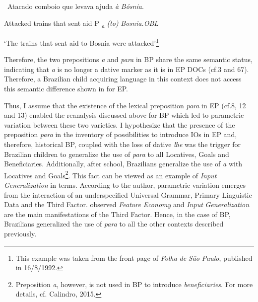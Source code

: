 \documentclass[output=paper,modfonts,nonflat]{langsci/langscibook}
\begin{document}
\ea%
    \label{ex:key:13}
    \gll\\
        \\
    \glt
    \z

         ~Atacado   comboio que levava   ajuda  \textit{à} \textit{Bósnia}. 

          Attacked  trains       that sent      aid      P \textit{\textsubscript{a} \textit{(to)} }\textit{Bosnia.OBL}

         ‘The trains that sent aid  to Bosnia were attacked’\footnote{ \textrm{This example was taken from the front page of} \textrm{\textit{Folha} \textit{de} \textit{São} \textit{Paulo}}\textrm{, published in 16/8/1992.} } 


Therefore, the two prepositions \textit{a} and \textit{para} in BP share the same semantic status, indicating that \textit{a} is no longer a dative marker as it is in EP DOCs (cf.3 and 67). Therefore, a Brazilian child acquiring language in this context does not access this semantic difference shown in  for EP.

Thus, I assume that the existence of the lexical preposition \textit{para} in EP (cf.8, 12 and 13) enabled the reanalysis discussed above for BP which led to parametric variation between these two varieties. I hypothesize that the presence of the preposition \textit{para} in the inventory of possibilities to introduce IOs in EP and, therefore, historical BP, coupled with the loss of dative \textit{lhe} was the trigger for Brazilian children to generalize the use of \textit{para} to all Locatives, Goals and Beneficiaries. Additionally, after school, Brazilians generalize the use of \textit{a} with Locatives and Goals\footnote{\textrm{Preposition} \textrm{\textit{a}}\textrm{, however, is not used in BP to introduce} \textrm{\textit{beneficiaries}}\textrm{. For more details, cf. Calindro, 2015.}}. This fact can be viewed as an example of \textit{Input} \textit{Generalization} in  terms. According to the author, parametric variation emerges from the interaction of an underspecified Universal Grammar, Primary Linguistic Data and the Third Factor. \citet{BiberauerRoberts2015} observed \textit{Feature} \textit{Economy} and \textit{Input} \textit{Generalization} are the main manifestations of the Third Factor. Hence, in the case of BP, Brazilians generalized the use of \textit{para} to all the other contexts described previously.
\end{document}
